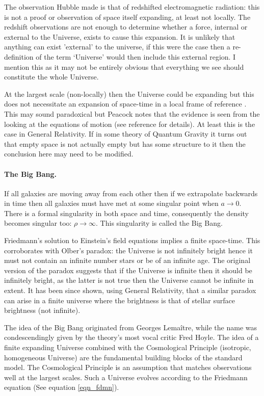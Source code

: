The observation Hubble made is that of redshifted electromagnetic radiation: this is not a proof or observation of space itself expanding, at least not locally. The redshift observations are not enough to determine whether a force, internal or external to the Universe, exists to cause this expansion. It is unlikely that anything can exist 'external' to the universe, if this were the case then a re-definition of the term `Universe' would then include this external region. I mention this as it may not be entirely obvious that everything we see should constitute the whole Universe.

At the largest scale (non-locally) then the Universe could be expanding but this does not necessitate an expansion of space-time in a local frame of reference \citep{bib_pea2}. This may sound paradoxical but Peacock notes that the evidence is seen from the looking at the equations of motion (see reference for details). At least this is the case in General Relativity. If in some theory of Quantum Gravity it turns out that empty space is not actually empty but has some structure to it then the conclusion here may need to be modified.

\paragraph{The Big Bang.} If all galaxies are moving away from each other then if we extrapolate backwards in time then all galaxies must have met at some singular point when $a \rightarrow 0$. There is a formal singularity in both space and time, consequently the density becomes singular too: $\rho\rightarrow \infty$. This singularity is called the Big Bang.

Friedmann's solution to Einstein's field equations implies a finite space-time. This corroborates with Olber's paradox: the Universe is not infinitely bright hence it must not contain an infinite number stars or be of an infinite age. The original version of the paradox suggests that if the Universe is infinite then it should be infinitely bright, as the latter is not true then the Universe cannot be infinite in extent. It has been since shown, using General Relativity, that a similar paradox can arise in a finite universe where the brightness is that of stellar surface brightness (not infinite).

The idea of the Big Bang originated from Georges Lema\^itre, while the name was condescendingly given by the theory's most vocal critic Fred Hoyle. The idea of a finite expanding Universe combined with the Cosmological Principle (isotropic, homogeneous Universe) are the fundamental building blocks of the standard model. The Cosmological Principle is an assumption that matches observations well at the largest scales. Such a Universe evolves according to the Friedmann equation (See equation \ref{eqn_fdmn}).

